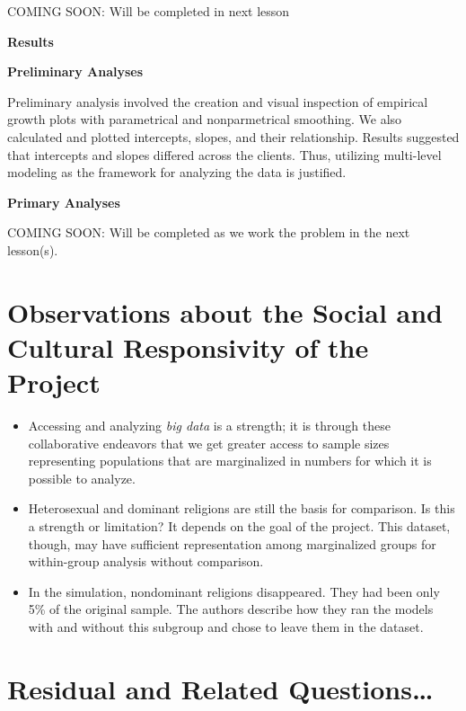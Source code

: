 \documentclass[
  11pt,
]{book}
\providecommand{\tightlist}{%
  \setlength{\itemsep}{0pt}\setlength{\parskip}{0pt}}
\begin{document}
COMING SOON: Will be completed in next lesson

\textbf{Results}

\textbf{Preliminary Analyses}

Preliminary analysis involved the creation and visual inspection of empirical growth plots with parametrical and nonparmetrical smoothing. We also calculated and plotted intercepts, slopes, and their relationship. Results suggested that intercepts and slopes differed across the clients. Thus, utilizing multi-level modeling as the framework for analyzing the data is justified.

\textbf{Primary Analyses}

COMING SOON: Will be completed as we work the problem in the next lesson(s).

\hypertarget{observations-about-the-social-and-cultural-responsivity-of-the-project}{%
\section{Observations about the Social and Cultural Responsivity of the Project}\label{observations-about-the-social-and-cultural-responsivity-of-the-project}}

\begin{itemize}
\tightlist
\item
  Accessing and analyzing \emph{big data} is a strength; it is through these collaborative endeavors that we get greater access to sample sizes representing populations that are marginalized in numbers for which it is possible to analyze.
\item
  Heterosexual and dominant religions are still the basis for comparison. Is this a strength or limitation? It depends on the goal of the project. This dataset, though, may have sufficient representation among marginalized groups for within-group analysis without comparison.
\item
  In the simulation, nondominant religions disappeared. They had been only 5\% of the original sample. The authors describe how they ran the models with and without this subgroup and chose to leave them in the dataset.
\end{itemize}

\hypertarget{residual-and-related-questions-1}{%
\section{Residual and Related Questions\ldots{}}\label{residual-and-related-questions-1}}
\end{document}

